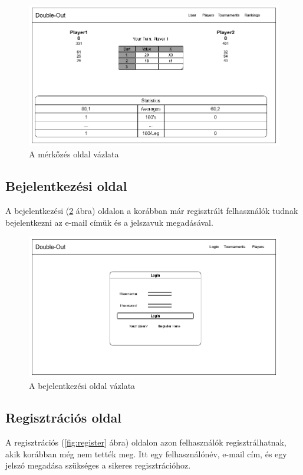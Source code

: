 \begin{figure}[h]
\centering
\includegraphics[scale=0.4]{images/MatchPage.png}
\caption{A mérkőzés oldal vázlata}
\label{fig:match}
\end{figure}

\subsection{Bejelentkezési oldal}
A bejelentkezési (\ref{fig:login} ábra) oldalon a korábban már regisztrált felhasználók tudnak bejelentkezni az e-mail címük és a jelszavuk megadásával.

\begin{figure}[h]
\centering
\includegraphics[scale=0.4]{images/Login.png}
\caption{A bejelentkezési oldal vázlata}
\label{fig:login}
\end{figure}

\subsection{Regisztrációs oldal}
A regisztrációs (\ref{fig:register} ábra) oldalon azon felhasználók regisztrálhatnak, akik korábban még nem tették meg. Itt egy felhasználónév, e-mail cím, és egy jelszó megadása szükséges a sikeres regisztrációhoz.


